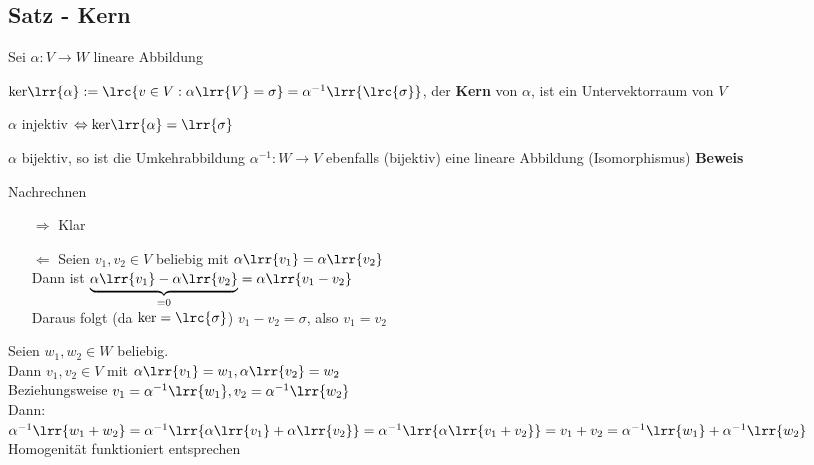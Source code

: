 \subsection{Satz - Kern}
	Sei $\alpha:V\rightarrow W$ lineare Abbildung
		\item $\mbox{ker}\lrr{\alpha}:=\lrc{v\in V:\alpha\lrr{V}=\sigma}=\alpha^{-1}\lrr{\lrc{\sigma}}$, der \textbf{Kern} von $\alpha$, ist ein Untervektorraum von $V$
		\item $\alpha$ injektiv $\Leftrightarrow\mbox{ker}\lrr{\alpha}=\lrr{\sigma}$
		\item $\alpha$ bijektiv, so ist die Umkehrabbildung $\alpha^{-1}:W\rightarrow V$ ebenfalls (bijektiv) eine lineare Abbildung (Isomorphismus)
	\subExEnd
	\textbf{Beweis}
		\item Nachrechnen
		\item
			\begin{enumerate}
				\item[$\Rightarrow$] Klar
				\item[$\Leftarrow$] Seien $v_1,v_2\in V$ beliebig mit $\alpha\lrr{v_1}=\alpha\lrr{v_2}$\\
					Dann ist $\underbrace{\alpha\lrr{v_1}-\alpha\lrr{v_2}}_{\scriptstyle =0}=\alpha\lrr{v_1-v_2}$\\
					Daraus folgt (da $\mbox{ker}=\lrc{\sigma}$) $v_1-v_2=\sigma$, also $v_1=v_2$
			\end{enumerate}
		\item Seien $w_1,w_2\in W$ beliebig.\\
			Dann $v_1,v_2\in V$ mit $\alpha\lrr{v_1}=w_1,\alpha\lrr{v_2}=w_2$\\
			Beziehungsweise $v_1=\alpha^{-1}\lrr{w_1}, v_2=\alpha^{-1}\lrr{w_2}$\\
			Dann:\\
			$\alpha^{-1}\lrr{w_1+w_2}=\alpha^{-1}\lrr{\alpha\lrr{v_1}+\alpha\lrr{v_2}}=\alpha^{-1}\lrr{\alpha\lrr{v_1+v_2}}=v_1+v_2=
			\alpha^{-1}\lrr{w_1}+\alpha^{-1}\lrr{w_2}$\\
			Homogenität funktioniert entsprechen
	\subExEnd
	
